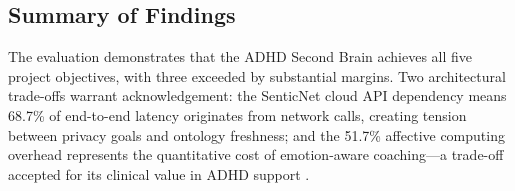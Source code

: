 \subsection{Summary of Findings}
\label{subsec:evaluation-summary}

The evaluation demonstrates that the ADHD Second Brain achieves all five project objectives, with three exceeded by substantial margins. Two architectural trade-offs warrant acknowledgement: the SenticNet cloud API dependency means 68.7\% of end-to-end latency originates from network calls, creating tension between privacy goals and ontology freshness; and the 51.7\% affective computing overhead represents the quantitative cost of emotion-aware coaching---a trade-off accepted for its clinical value in ADHD support \cite{beattie2025, faraone2021}.
